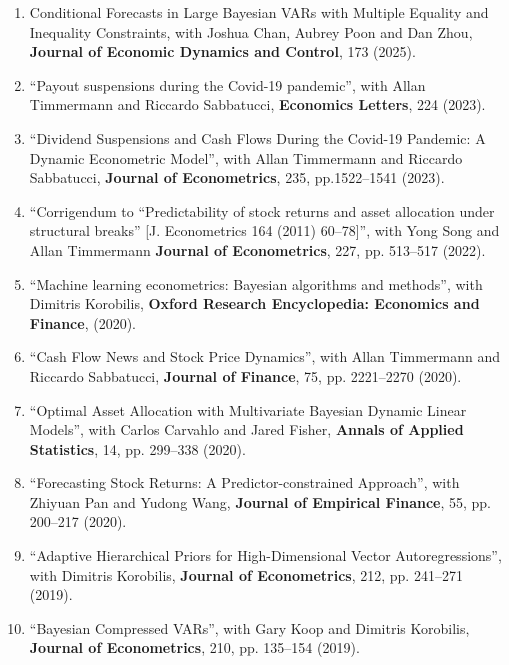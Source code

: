 \documentclass[12pt]{article}
\begin{document}
\begin{enumerate}	
	
			\item Conditional Forecasts in Large Bayesian VARs with Multiple Equality and Inequality Constraints, with Joshua Chan, Aubrey Poon and Dan Zhou, \textbf{Journal of Economic Dynamics and Control}, 173 (2025).
	
			\item ``Payout suspensions during the Covid-19 pandemic'', 	with Allan Timmermann and Riccardo Sabbatucci, \textbf{Economics Letters}, 224 (2023).
		
			\item ``Dividend Suspensions and Cash Flows During the Covid-19 Pandemic: A Dynamic Econometric Model'', with Allan Timmermann and Riccardo Sabbatucci, \textbf{Journal of Econometrics}, 235, pp.1522--1541 (2023).
	
		\item ``Corrigendum to “Predictability of stock returns and asset allocation under structural breaks” [J. Econometrics 164 (2011) 60–78]'', with Yong Song and Allan Timmermann \textbf{Journal of Econometrics}, 227, pp. 513--517 (2022).
	
		\item ``Machine learning econometrics: Bayesian algorithms and methods'', with Dimitris Korobilis, \textbf{Oxford Research Encyclopedia: Economics and Finance}, (2020).
	
		\item ``Cash Flow News and Stock Price Dynamics'', with Allan Timmermann and Riccardo Sabbatucci, \textbf{Journal of Finance}, 75, pp. 2221--2270  (2020).
		
		\item ``Optimal Asset Allocation with Multivariate Bayesian Dynamic Linear Models'', with Carlos Carvahlo and Jared Fisher, \textbf{Annals of Applied Statistics}, 14, pp. 299--338 (2020).
		
		\item ``Forecasting Stock Returns: A Predictor-constrained Approach'', with Zhiyuan Pan and Yudong Wang, \textbf{Journal of Empirical Finance}, 55, pp. 200--217 (2020).
		
		\item ``Adaptive Hierarchical Priors for High-Dimensional Vector Autoregressions'', with Dimitris Korobilis, \textbf{Journal of Econometrics}, 212, pp. 241--271 (2019).
		
		\item ``Bayesian Compressed VARs'', with Gary Koop and Dimitris Korobilis, \textbf{Journal of Econometrics}, 210, pp. 135--154 (2019).
		

\end{enumerate}
\end{document}
